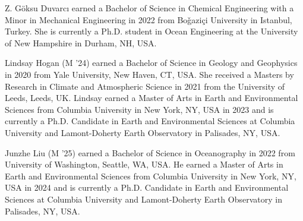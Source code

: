 \documentclass[letterpaper,journal]{IEEEtran}
\begin{document}
\begin{IEEEbiography}
{Z. G\"oksu Duvarc\i}
earned a Bachelor of Science in Chemical Engineering with a Minor in Mechanical Engineering in 2022 from Bo\v gazi\c ci University in Istanbul, Turkey. She is currently a Ph.D. student in Ocean Engineering at the University of New Hampshire in Durham, NH, USA.
\end{IEEEbiography}

\begin{IEEEbiography}{Lindsay Hogan}
(M '24) earned a Bachelor of Science in Geology and Geophysics in 2020 from Yale University, New Haven, CT, USA. She received a Masters by Research in Climate and Atmospheric Science in 2021 from the University of Leeds, Leeds, UK. Lindsay earned a Master of Arts in Earth and Environmental Sciences from Columbia University in New York, NY, USA in 2023 and is currently a Ph.D. Candidate in Earth and Environmental Sciences at Columbia University and Lamont-Doherty Earth Observatory in Palisades, NY, USA.
\end{IEEEbiography}

\begin{IEEEbiography}{Junzhe Liu}
(M '25) earned a Bachelor of Science in Oceanography in 2022 from University of Washington, Seattle, WA, USA. He earned a Master of Arts in Earth and Environmental Sciences from Columbia University in New York, NY, USA in 2024 and is currently a Ph.D. Candidate in Earth and Environmental Sciences at Columbia University and Lamont-Doherty Earth Observatory in Palisades, NY, USA.
\end{IEEEbiography}
\end{document}
